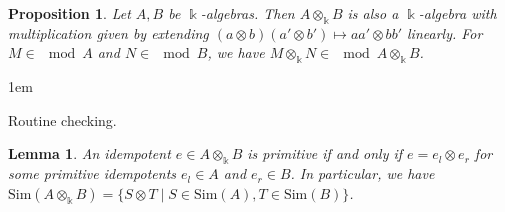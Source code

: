 \documentclass[11pt,a4paper]{article}
\makeatletter
\numberwithin{equation}{section}
\renewenvironment{proof}[1][\proofname]{\par
    \pushQED{\qed}%
    \normalfont \topsep0\p@\@plus6\p@ \labelsep1em\relax
    \trivlist
    \item[\hskip\labelsep\indent
        \bfseries #1]\ignorespaces
    \mbox{}
}{
    \popQED\endtrivlist\@endpefalse
}
\theoremstyle{all}
\newtheorem{proposition}[theorem]{Proposition}
\newtheorem{lemma}[theorem]{Lemma}
\newtheorem{example}[theorem]{Example}
\theoremstyle{remark}
\newcommand{\Mat}{\operatorname{Mat}\nolimits}
\newcommand{\GL}{\operatorname{GL}\nolimits}
\makeatother
\begin{document}

\begin{proposition}
Let $A, B$ be $\Bbbk$-algebras.  Then $A\otimes_\Bbbk B$ is also a $\Bbbk$-algebra with multiplication given by extending $(a\otimes b)(a'\otimes b')\mapsto aa'\otimes bb'$ linearly.  For $M\in \mod A$ and $N\in \mod B$, we have $M\otimes_\Bbbk N\in \mod A\otimes_\Bbbk B$.
\end{proposition}
\begin{proof}
Routine checking.
\end{proof}



\begin{lemma}
An idempotent $e\in A\otimes_{\Bbbk} B$ is primitive if and only if $e=e_l\otimes e_r$ for some primitive idempotents $e_l\in A$ and $e_r\in B$.
In particular, we have $\mathrm{Sim}(A\otimes_{\Bbbk}B) = \{S\otimes T\mid S\in\mathrm{Sim}(A), T\in\mathrm{Sim}(B)\}$.
\end{lemma}
\end{document}

